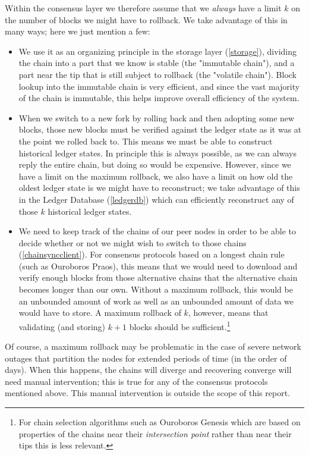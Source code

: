 Within the consensus layer we therefore assume that we \emph{always} have a
limit $k$ on the number of blocks we might have to rollback. We take advantage
of this in many ways; here we just mention a few:

\begin{itemize}
\item We use it as an organizing principle in the storage layer
(\cref{storage}), dividing the chain into a part that we know is stable (the
"immutable chain"), and a part near the tip that is still subject to rollback
(the "volatile chain"). Block lookup into the immutable chain is very efficient,
and since the vast majority of the chain is immutable, this helps improve
overall efficiency of the system.

\item When we switch to a new fork by rolling back and then adopting some new
blocks, those new blocks must be verified against the ledger state as it was
at the point we rolled back to. This means we must be able to construct
historical ledger states. In principle this is always possible, as we can always
reply the entire chain, but doing so would be expensive. However, since we have
a limit on the maximum rollback, we also have a limit on how old the oldest
ledger state is we might have to reconstruct; we take advantage of this in the
Ledger Database (\cref{ledgerdb}) which can efficiently reconstruct any of those
$k$ historical ledger states.

\item We need to keep track of the chains of our peer nodes in order to be able
to decide whether or not we might wish to switch to those chains
(\cref{chainsyncclient}). For consensus protocols based on a longest chain rule
(such as Ouroboros Praos), this means that we would need to download and verify
enough blocks from those alternative chains that the alternative chain becomes
longer than our own. Without a maximum rollback, this would be an unbounded
amount of work as well as an unbounded amount of data we would have to store.
A maximum rollback of $k$, however, means that validating (and storing) $k+1$
blocks should be sufficient.\footnote{For chain selection algorithms such as
Ouroboros Genesis which are based on properties of the chains near their
\emph{intersection point} rather than near their tips this is less relevant.}
\end{itemize}

Of course, a maximum rollback may be problematic in the case of severe network
outages that partition the nodes for extended periods of time (in the order of
days). When this happens, the chains will diverge and recovering converge will
need manual intervention; this is true for any of the consensus protocols
mentioned above. This manual intervention is outside the scope of this report.


